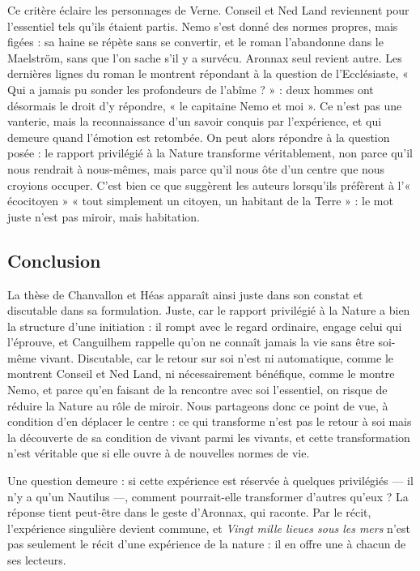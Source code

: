 \documentclass[11pt,a4paper]{article}
\begin{document}
Ce critère éclaire les personnages de Verne. Conseil et Ned Land reviennent pour l'essentiel tels qu'ils étaient partis. Nemo s'est donné des normes propres, mais figées : sa haine se répète sans se convertir, et le roman l'abandonne dans le Maelström, sans que l'on sache s'il y a survécu. Aronnax seul revient autre. Les dernières lignes du roman le montrent répondant à la question de l'Ecclésiaste, « Qui a jamais pu sonder les profondeurs de l'abîme ? » : deux hommes ont désormais le droit d'y répondre, « le capitaine Nemo et moi ». Ce n'est pas une vanterie, mais la reconnaissance d'un savoir conquis par l'expérience, et qui demeure quand l'émotion est retombée. On peut alors répondre à la question posée : le rapport privilégié à la Nature transforme véritablement, non parce qu'il nous rendrait à nous-mêmes, mais parce qu'il nous ôte d'un centre que nous croyions occuper. C'est bien ce que suggèrent les auteurs lorsqu'ils préfèrent à l'« écocitoyen » « tout simplement un citoyen, un habitant de la Terre » : le mot juste n'est pas miroir, mais habitation.

\hypertarget{conclusion}{%
\subsection{Conclusion}\label{conclusion}}

La thèse de Chanvallon et Héas apparaît ainsi juste dans son constat et discutable dans sa formulation. Juste, car le rapport privilégié à la Nature a bien la structure d'une initiation : il rompt avec le regard ordinaire, engage celui qui l'éprouve, et Canguilhem rappelle qu'on ne connaît jamais la vie sans être soi-même vivant. Discutable, car le retour sur soi n'est ni automatique, comme le montrent Conseil et Ned Land, ni nécessairement bénéfique, comme le montre Nemo, et parce qu'en faisant de la rencontre avec soi l'essentiel, on risque de réduire la Nature au rôle de miroir. Nous partageons donc ce point de vue, à condition d'en déplacer le centre : ce qui transforme n'est pas le retour à soi mais la découverte de sa condition de vivant parmi les vivants, et cette transformation n'est véritable que si elle ouvre à de nouvelles normes de vie.

Une question demeure : si cette expérience est réservée à quelques privilégiés --- il n'y a qu'un Nautilus ---, comment pourrait-elle transformer d'autres qu'eux ? La réponse tient peut-être dans le geste d'Aronnax, qui raconte. Par le récit, l'expérience singulière devient commune, et \emph{Vingt mille lieues sous les mers} n'est pas seulement le récit d'une expérience de la nature : il en offre une à chacun de ses lecteurs.
\end{document}
